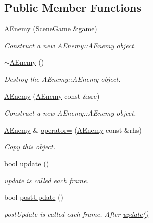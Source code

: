 \subsection*{Public Member Functions}
\begin{DoxyCompactItemize}
\item 
\hyperlink{class_a_enemy_a951b8e4a3fbd53542740f8ba3f01b79d}{A\+Enemy} (\hyperlink{class_scene_game}{Scene\+Game} \&\hyperlink{class_a_entity_aa2c05db944a8b7487eb8470dd20211ab}{game})
\begin{DoxyCompactList}\small\item\em Construct a new A\+Enemy\+::\+A\+Enemy object. \end{DoxyCompactList}\item 
\mbox{\label{class_a_enemy_a919ea252218c21ff208181e53771b8ab}} 
\hyperlink{class_a_enemy_a919ea252218c21ff208181e53771b8ab}{$\sim$\+A\+Enemy} ()
\begin{DoxyCompactList}\small\item\em Destroy the A\+Enemy\+::\+A\+Enemy object. \end{DoxyCompactList}\item 
\hyperlink{class_a_enemy_add417acf741a28c3896fce4ffbad2e2a}{A\+Enemy} (\hyperlink{class_a_enemy}{A\+Enemy} const \&src)
\begin{DoxyCompactList}\small\item\em Construct a new A\+Enemy\+::\+A\+Enemy object. \end{DoxyCompactList}\item 
\hyperlink{class_a_enemy}{A\+Enemy} \& \hyperlink{class_a_enemy_a87e3db110aa11d461768f794bfb48c40}{operator=} (\hyperlink{class_a_enemy}{A\+Enemy} const \&rhs)
\begin{DoxyCompactList}\small\item\em Copy this object. \end{DoxyCompactList}\item 
bool \hyperlink{class_a_enemy_a01e3b0313d6f29bf2cafe20f711c0550}{update} ()
\begin{DoxyCompactList}\small\item\em update is called each frame. \end{DoxyCompactList}\item 
bool \hyperlink{class_a_enemy_a2d2ff5a126f14294bdbc17475c363d00}{post\+Update} ()
\begin{DoxyCompactList}\small\item\em post\+Update is called each frame. After \hyperlink{class_a_enemy_a01e3b0313d6f29bf2cafe20f711c0550}{update()} \end{DoxyCompactList}\item 

\end{DoxyCompactItemize}
